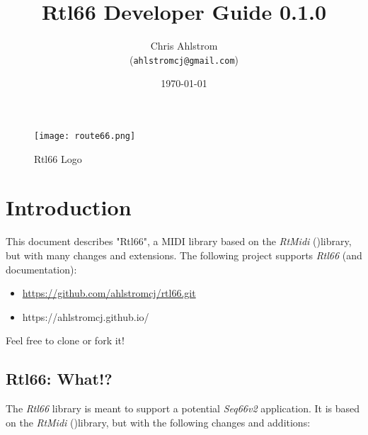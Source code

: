\documentclass[
 11pt,
 twoside,
 a4paper,
 final                                 %
]{article}
\begin{document}
\title{Rtl66 Developer Guide 0.1.0}
\author{Chris Ahlstrom \\
   (\texttt{ahlstromcj@gmail.com})}
\date{\today}
\maketitle

\begin{figure}[H]
   \centering 
   \texttt{[image: route66.png]}
   \caption*{Rtl66 Logo}
\end{figure}

\clearpage                             %

\tableofcontents
\listoffigures                         %
\listoftables                          %


\setlength{\parindent}{2em}
\setlength{\parskip}{1ex plus 0.5ex minus 0.2ex}

\rhead{\rightmark}         %

\section{Introduction}
\label{sec:introduction}

   This document describes "Rtl66", a MIDI library based on the
   \textsl{RtMidi} (\cite{rtmidi})library, but with many changes and extensions.
   The following project supports \textsl{Rtl66} (and documentation):

   \begin{itemize}
      \item \url{https://github.com/ahlstromcj/rtl66.git}
      \item https://ahlstromcj.github.io/
   \end{itemize}

   Feel free to clone or fork it!

\subsection{Rtl66: What!?}
\label{subsec:what_is_rtl66}

   The \textsl{Rtl66} library is meant to support a potential
   \textsl{Seq66v2} application.
   It is based on the \textsl{RtMidi} (\cite{rtmidi})library, but with the
   following changes and additions:
\end{document}
